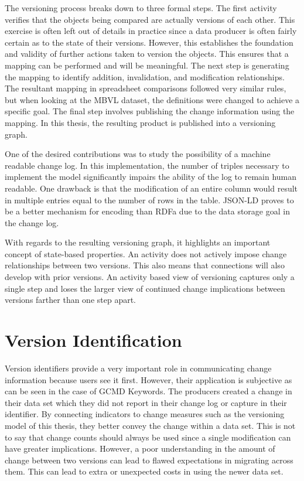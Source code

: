 The versioning process breaks down to three formal steps.
The first activity verifies that the objects being compared are actually versions of each other.
This exercise is often left out of details in practice since a data producer is often fairly certain as to the state of their versions.
However, this establishes the foundation and validity of further actions taken to version the objects.
This ensures that a mapping can be performed and will be meaningful.
The next step is generating the mapping to identify addition, invalidation, and modification relationships.
The resultant mapping in spreadsheet comparisons followed very similar rules, but when looking at the MBVL dataset, the definitions were changed to achieve a specific goal.
The final step involves publishing the change information using the mapping.
In this thesis, the resulting product is published into a versioning graph.

One of the desired contributions was to study the possibility of a machine readable change log.
In this implementation, the number of triples necessary to implement the model significantly impairs the ability of the log to remain human readable.
One drawback is that the modification of an entire column would result in multiple entries equal to the number of rows in the table.
JSON-LD proves to be a better mechanism for encoding than RDFa due to the data storage goal in the change log.

With regards to the resulting versioning graph, it highlights an important concept of state-based properties.
An activity does not actively impose change relationships between two versions.
This also means that connections will also develop with prior versions.
An activity based view of versioning captures only a single step and loses the larger view of continued change implications between versions farther than one step apart.

\section{Version Identification}

Version identifiers provide a very important role in communicating change information because users see it first.
However, their application is subjective as can be seen in the case of GCMD Keywords.
The producers created a change in their data set which they did not report in their change log or capture in their identifier.
By connecting indicators to change measures such as the versioning model of this thesis, they better convey the change within a data set.
This is not to say that change counts should always be used since a single modification can have greater implications.
However, a poor understanding in the amount of change between two versions can lead to flawed expectations in migrating across them.
This can lead to extra or unexpected costs in using the newer data set.

